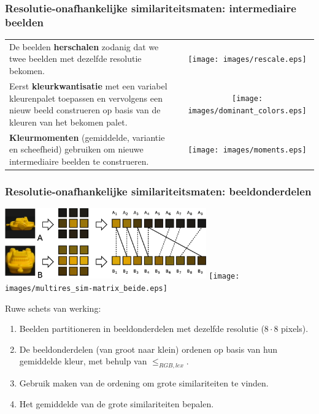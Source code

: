 \documentclass[dutch]{beamer}
\theoremstyle{definition}
\theoremstyle{remark}
\theoremstyle{example}
\begin{document}
\frame
{
  \frametitle{Resolutie-onafhankelijke similariteitsmaten: intermediaire beelden}

  \begin{center}
  \begin{tabular}{@{}lc@{}}
  \begin{minipage}{0.6\textwidth}
  De beelden \textbf{herschalen} zodanig dat we twee beelden met dezelfde resolutie bekomen. 
  \end{minipage} & 
  \begin{minipage}{0.4\textwidth}
  \texttt{[image: images/rescale.eps]}
  \end{minipage}\vspace{5pt}\\
  \begin{minipage}{0.6\textwidth}
  Eerst \textbf{kleurkwantisatie} met een variabel kleurenpalet toepassen en vervolgens een
  nieuw beeld construeren op basis van de kleuren van het bekomen palet.
  \end{minipage} &
  \begin{minipage}{0.4\textwidth}
  \texttt{[image: images/dominant\_colors.eps]}
  \end{minipage}\vspace{5pt}\\
  \begin{minipage}{0.6\textwidth}
  \textbf{Kleurmomenten} (gemiddelde, variantie en scheefheid) gebruiken om nieuwe 
  intermediaire beelden te construeren.
  \end{minipage} &
  \begin{minipage}{0.4\textwidth}
  \texttt{[image: images/moments.eps]}
  \end{minipage}
  \end{tabular}
  \end{center}
}
\frame
{
  \frametitle{Resolutie-onafhankelijke similariteitsmaten: beeldonderdelen}
  
  \begin{minipage}{\textwidth}
  \centering
  \includegraphics[width=0.65\textwidth]{images/multires.eps}\qquad
  \texttt{[image: images/multires\_sim-matrix\_beide.eps]}
  \vspace{4pt}
  \end{minipage}
  Ruwe schets van werking:
  \begin{enumerate}
    \item Beelden partitioneren in beeldonderdelen met dezelfde resolutie 
    ($8 \cdot 8$ pixels).
    \item De beeldonderdelen (van groot naar klein) ordenen op basis van
    hun gemiddelde kleur, met behulp van $\le_{RGB,lex}$.
    \item Gebruik maken van de ordening om grote similariteiten te vinden.
    \item Het gemiddelde van de grote similariteiten bepalen.
  \end{enumerate}
}
\end{document}
